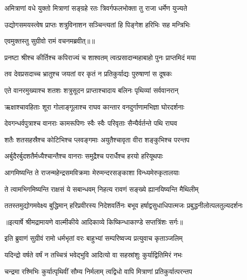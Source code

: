 \twolineshloka
{अमित्राणां वधे युक्तो मित्राणां सङ्ग्रहे रतः}
{त्रिवर्गफलभोक्ता तु राजा धर्मेण युज्यते} %

\twolineshloka
{उद्योगसमयस्त्वेष प्राप्तः शत्रुविनाशन}
{सञ्चिन्त्यतां हि पिङ्गेश हरिभिः सह मन्त्रिभिः} %

{एवमुक्तस्तु सुग्रीवो रामं वचनमब्रवीत्॥॥} %

\addtocounter{shlokacount}{1}

\twolineshloka
{प्रनष्टा श्रीश्च कीर्तिश्च कपिराज्यं च शाश्वतम्}
{त्वत्प्रसादान्महाबाहो पुनः प्राप्तमिदं मया} %

\twolineshloka
{तव देवप्रसदाच्च भ्रातुश्च जयतां वर}
{कृतं न प्रतिकुर्याद्यः पुरुषाणां स दूषकः} %

\twolineshloka
{एते वानरमुख्याश्च शतशः शत्रुसूदन}
{प्राप्ताश्चादाय बलिनः पृथिव्यां सर्ववानरान्} %

\twolineshloka
{ऋक्षाश्चावहिताः शूरा गोलाङ्गूलाश्च राघव}
{कान्तार वनदुर्गाणामभिज्ञा घोरदर्शनाः} %

\twolineshloka
{देवगन्धर्वपुत्राश्च वानराः कामरूपिणः}
{स्वैः स्वैः परिवृताः सैन्यैर्वर्तन्ते पथि राघव} %

\twolineshloka
{शतैः शतसहस्रैश्च कोटिभिश्च प्लवङ्गमाः}
{अयुतैश्चावृता वीरा शङ्कुभिश्च परन्तप} %

\twolineshloka
{अर्बुदैरर्बुदशतैर्मध्यैश्चान्तैश्च वानराः}
{समुद्रैश्च परार्धैश्च हरयो हरियूथपाः} %

\twolineshloka
{आगमिष्यन्ति ते राजन्महेन्द्रसमविक्रमाः}
{मेरुमन्दरसङ्काशा विन्ध्यमेरुकृतालयाः} %

\twolineshloka
{ते त्वामभिगमिष्यन्ति राक्षसं ये सबान्धवम्}
{निहत्य रावणं सङ्ख्ये ह्यानयिष्यन्ति मैथिलीम्} %

\fourlineindentedshloka
{ततस्तमुद्योगमवेक्ष्य बुद्धिमान्}
{हरिप्रवीरस्य निदेशवर्तिनः}
{बभूव हर्षाद्वसुधाधिपात्मजः}
{प्रबुद्धनीलोत्पलतुल्यदर्शनः} %


{॥इत्यार्षे श्रीमद्रामायणे वाल्मीकीये आदिकाव्ये किष्किन्धाकाण्डे सप्तत्रिंशः सर्गः॥}


\twolineshloka
{इति ब्रुवाणं सुग्रीवं रामो धर्मभृतां वरः}
{बाहुभ्यां सम्परिष्वज्य प्रत्युवाच कृताञ्जलिम्} %

\twolineshloka
{यदिन्द्रो वर्षते वर्षं न तच्चित्रं भवेद्भुवि}
{आदित्यो वा सहस्रांशुः कुर्याद्वितिमिरं नभः} %

\twolineshloka
{चन्द्रमा रश्मिभिः कुर्यात्पृथिवीं सौम्य निर्मलाम्}
{त्वद्विधो वापि मित्राणां प्रतिकुर्यात्परन्तप} %

